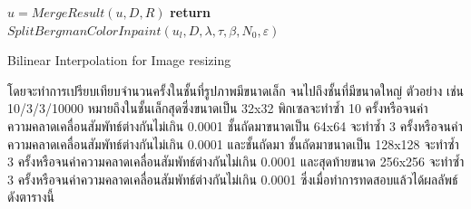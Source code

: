 \documentclass[hidelinks, a4paper,12pt]{article}
\numberwithin{equation}{section}							%
\numberwithin{equation}{section}
\begin{document}
{\begin{algorithm}[H]
{{				$u = MergeResult(u,D,R)$
			}
			\textbf{return} $ SplitBergmanColorInpaint(u_l, D, \lambda, \tau, \beta, N_0, \varepsilon) $ 
		}
	\end{algorithm}
	\newpage
	\begin{algorithm}[H]
		\caption{Bilinear Interpolation for Image resizing}
	\end{algorithm}

	\hspace{1cm} โดยจะทำการเปรียบเทียบจำนวนครั้งในชั้นที่รูปภาพมีขนาดเล็ก จนไปถึงชั้นที่มีขนาดใหญ่ ตัวอย่าง เช่น 10/3/3/10000 หมายถึงในชั้นเล็กสุดซึ่งขนาดเป็น 32x32 พิกเซลจะทำซ้ำ 10 ครั้งหรือจนค่าความคลาดเคลื่อนสัมพัทธ์ต่างกันไม่เกิน 0.0001  ชั้นถัดมาขนาดเป็น 64x64 จะทำซ้ำ 3 ครั้งหรือจนค่าความคลาดเคลื่อนสัมพัทธ์ต่างกันไม่เกิน 0.0001 และชั้นถัดมา ชั้นถัดมาขนาดเป็น 128x128 จะทำซ้ำ 3 ครั้งหรือจนค่าความคลาดเคลื่อนสัมพัทธ์ต่างกันไม่เกิน 0.0001 และสุดท้ายขนาด 256x256 จะทำซ้ำ 3 ครั้งหรือจนค่าความคลาดเคลื่อนสัมพัทธ์ต่างกันไม่เกิน 0.0001 ซึ่งเมื่อทำการทดสอบแล้วได้ผลลัพธ์ดังตารางนี้
	
}
\end{document}
